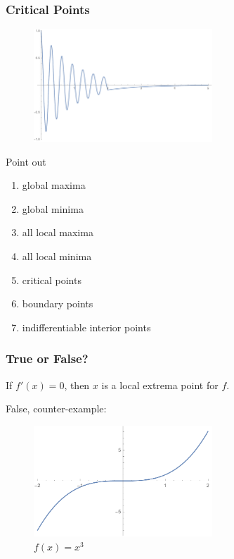 \documentclass[10pt, t]{beamer}
\begin{document}
\begin{frame}
    \frametitle{Critical Points}

    \begin{figure}[H]
        \centering
        \includegraphics[width=0.6\textwidth]{extrema.pdf}
    \end{figure}
    Point out
    \begin{enumerate}
        \item global maxima
        \item global minima
        \item all local maxima
        \item all local minima
        \item critical points
        \item boundary points
        \item indifferentiable interior points
    \end{enumerate}
\end{frame}

\begin{frame}
    \frametitle{True or False?}

    If $f'(x)=0$, then $x$ is a local extrema point for $f$.

    \pause
    False, counter-example:
    \begin{figure}[H]
        \centering
        \includegraphics[width=0.6\textwidth]{extrema2.pdf}
        \caption{$f(x)=x^3$}
    \end{figure}
\end{frame}
\end{document}

